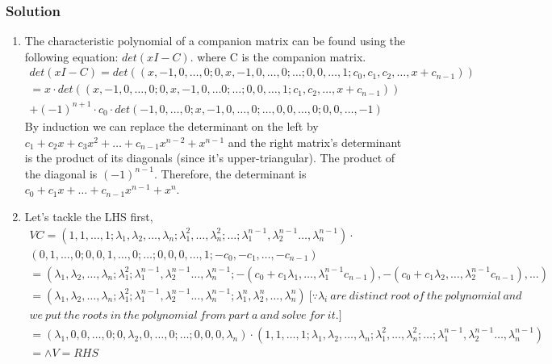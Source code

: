 \documentclass{article}
\begin{document}
\subsubsection*{Solution}
\begin{enumerate}[label=\alph*]
    \item The characteristic polynomial of a companion matrix can be found using the following equation: $det(x I - C)$. where C is the companion matrix.
    \begin{align*}
        det(x I - C) = det((x, -1, 0, \ldots, 0; 0, x, -1, 0, \ldots, 0; \ldots; 0,0,\ldots,1;c_0, c_1, c_2, \ldots, x+c_{n-1}))\\
         = x\cdot det((x, -1, 0, \ldots, 0; 0, x, -1, 0, \ldots 0; \ldots; 0,0,\ldots,1; c_1, c_2, \ldots, x+c_{n-1}))\\ 
    +(-1)^{n+1}\cdot c_0\cdot det(-1, 0,\ldots,0;x, -1, 0, \ldots, 0; \ldots, 0, 0, \ldots, 0; 0, 0, \ldots, -1)
    \end{align*}
    By induction we can replace the determinant on the left by $c_1+c_2x+ c_3x^2+\ldots+c_{n-1}x^{n-2}+x^{n-1}$ and the right matrix's determinant is the product of its diagonals (since it's upper-triangular). The product of the diagonal is $(-1)^{n-1}$. Therefore, the determinant is $c_0+c_1x+\ldots+c_{n-1}x^{n-1}+x^{n}$.
    \item Let's tackle the LHS first,
    \begin{align*}
        VC = (1,1,\ldots,1;\lambda_1, \lambda_2,\ldots, \lambda_n;\lambda_1^2,\ldots,\lambda_n^2;\ldots;\lambda_1^{n-1},\lambda_2^{n-1}\ldots,\lambda_n^{n-1}) \cdot\\
        (0,1,\ldots,0;0,0,1,\ldots,0;\ldots;0,0,0,\ldots,1;-c_0,-c_1,\ldots,-c_{n-1})\\
        = (\lambda_1, \lambda_2, \ldots, \lambda_n;\lambda_1^2;\lambda_1^{n-1},\lambda_2^{n-1}\ldots,\lambda_n^{n-1};-(c_0+c_1\lambda_1,\ldots,\lambda_1^{n-1}c_{n-1}),-(c_0+c_1\lambda_2,\ldots,\lambda_2^{n-1}c_{n-1}),\ldots)\\
        = (\lambda_1, \lambda_2, \ldots, \lambda_n;\lambda_1^2;\lambda_1^{n-1},\lambda_2^{n-1}\ldots,\lambda_n^{n-1};\lambda_1^n,\lambda_2^n,\ldots,\lambda_n^n)\ [\because \lambda_i\ are\ distinct\ root\ of\ the\ polynomial\ and\\ we\ put\
        the\ roots\ in\ the\ polynomial\ from\ part\ a\ and\ solve\ for\ it.]\\
        = (\lambda_1,0,0,\ldots,0;0,\lambda_2,0,\ldots,0;\ldots;0,0,0,\lambda_n)\cdot(1,1,\ldots,1;\lambda_1, \lambda_2,\ldots, \lambda_n;\lambda_1^2,\ldots,\lambda_n^2;\ldots;\lambda_1^{n-1},\lambda_2^{n-1}\ldots,\lambda_n^{n-1})\\
        = \wedge V = RHS
    \end{align*}
\end{enumerate}
\end{document}
